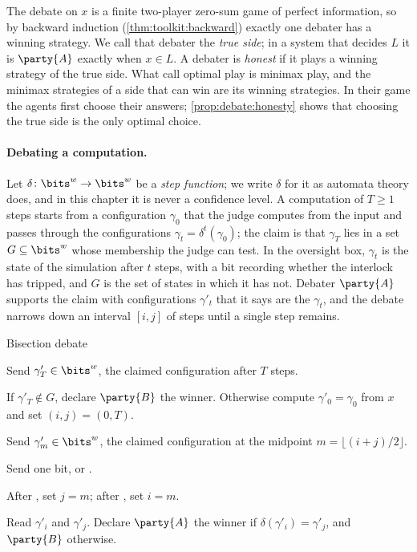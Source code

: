 \begin{refsection}
The debate on $x$ is a finite two-player zero-sum game of perfect information, so by backward induction (\cref{thm:toolkit:backward}) exactly one debater has a winning strategy. We call that debater the \emph{true side}; in a system that decides $L$ it is $\party{A}$ exactly when $x\in L$. A debater is \emph{honest} if it plays a winning strategy of the true side. What \textcite{IrvingEtAl2018} call optimal play is minimax play, and the minimax strategies of a side that can win are its winning strategies. In their game the agents first choose their answers; \cref{prop:debate:honesty} shows that choosing the true side is the only optimal choice.

\paragraph{Debating a computation.} Let $\delta\colon\bits^w\to\bits^w$ be a \emph{step function}; we write $\delta$ for it as automata theory does, and in this chapter it is never a confidence level. A computation of $T\ge1$ steps starts from a configuration $\gamma_0$ that the judge computes from the input and passes through the configurations $\gamma_t=\delta^t(\gamma_0)$; the claim is that $\gamma_T$ lies in a set $G\subseteq\bits^w$ whose membership the judge can test. In the oversight box, $\gamma_t$ is the state of the simulation after $t$ steps, with a bit recording whether the interlock has tripped, and $G$ is the set of states in which it has not. Debater $\party{A}$ supports the claim with configurations $\gamma'_t$ that it says are the $\gamma_t$, and the debate narrows down an interval $[i,j]$ of steps until a single step remains.

\begin{protocol}{Bisection debate}\label{prot:debate:bisection}
\item[\msg{A}{V}] Send $\gamma'_T\in\bits^w$, the claimed configuration after $T$ steps.
\item[\act{V}] If $\gamma'_T\notin G$, declare $\party{B}$ the winner. Otherwise compute $\gamma'_0=\gamma_0$ from $x$ and set $(i,j)=(0,T)$.
\item[\msg{A}{V}] Send $\gamma'_m\in\bits^w$, the claimed configuration at the midpoint $m=\lfloor(i+j)/2\rfloor$.
\item[\msg{B}{V}] Send one bit, \debateL{} or \debateR.
\item[\act{V}] After \debateL, set $j=m$; after \debateR, set $i=m$.
\item[\act{V}] Read $\gamma'_i$ and $\gamma'_j$. Declare $\party{A}$ the winner if $\delta(\gamma'_i)=\gamma'_j$, and $\party{B}$ otherwise.
\end{protocol}


\end{refsection}
